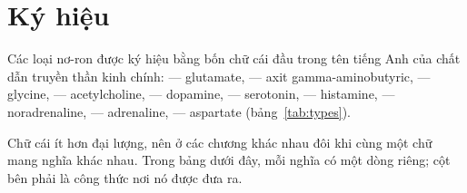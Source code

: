 \chapter{Ký hiệu}
\label{sec:notation}

Các loại nơ-ron được ký hiệu bằng bốn chữ cái đầu trong tên tiếng Anh của chất dẫn truyền thần kinh chính:  --- glutamate,  --- axit gamma-aminobutyric,  --- glycine,  --- acetylcholine,  --- dopamine,  --- serotonin,  --- histamine,  --- noradrenaline,  --- adrenaline,  --- aspartate (bảng~\ref{tab:types}).

Chữ cái ít hơn đại lượng, nên ở các chương khác nhau đôi khi cùng một chữ mang nghĩa khác nhau. Trong bảng dưới đây, mỗi nghĩa có một dòng riêng; cột bên phải là công thức nơi nó được đưa ra.

